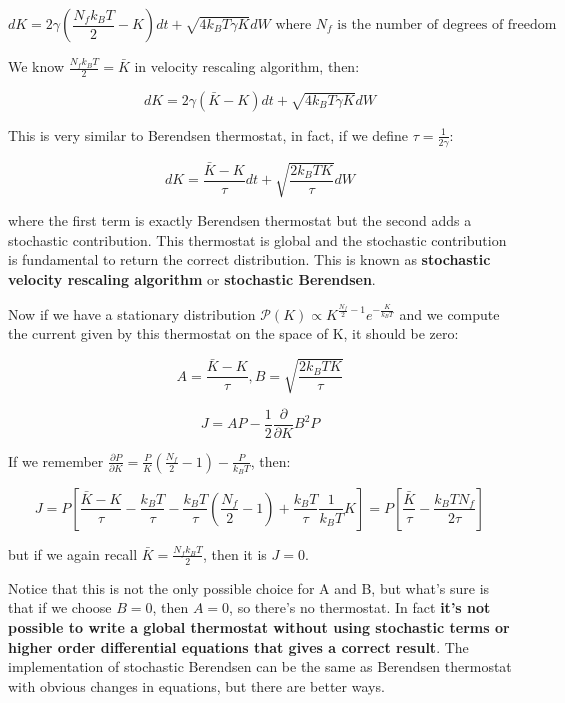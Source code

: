 \documentclass[a4paper, italian, openany]{book}
\begin{document}
$$dK= 2\gamma \left ( \frac{N_f k_B T}{2} - K \right )dt + \sqrt{4k_B T \gamma K}dW \mbox{ where } N_f \mbox{ is the number of degrees of freedom}$$

We know $\frac{N_f k_B T}{2} = \bar{K}$ in velocity rescaling algorithm, then:

$$dK = 2\gamma (\bar{K} -K)dt + \sqrt{4 k_B T \gamma K}dW$$

This is very similar to Berendsen thermostat, in fact, if we define $\tau = \frac{1}{2\gamma}$:

$$dK = \frac{\bar{K} - K}{\tau}dt + \sqrt{\frac{2 k_B T K}{\tau}}dW$$

where the first term is exactly Berendsen thermostat but the second adds a stochastic contribution. This thermostat is global and the stochastic contribution is fundamental to return the correct distribution. This is known as \textbf{stochastic velocity rescaling algorithm} or \textbf{stochastic Berendsen}.

\medskip

Now if we have a stationary distribution $\mathcal{P}(K) \propto K^{\frac{N_f}{2}-1}e^{-\frac{K}{k_B T}}$ and we compute the current given by this thermostat on the space of K, it should be zero:

$$A = \frac{\bar{K} -K}{\tau}, B = \sqrt{\frac{2k_B T K}{\tau}}$$

$$J = AP - \frac{1}{2}\frac{\partial}{\partial K}B^2 P$$

If we remember $\frac{\partial P}{\partial K} = \frac{P}{K} \left ( \frac{N_f}{2} -1 \right ) - \frac{P}{k_B T}$, then:

$$J = P \left [ \frac{\bar{K} -K}{\tau} - \frac{k_B T }{\tau} - \frac{k_B T}{\tau}\left ( \frac{N_f}{2} -1 \right ) + \frac{k_B T}{\tau}\frac{1}{k_B T}K\right ] = P\left [ \frac{\bar{K}}{\tau} - \frac{k_B T N_f}{2\tau} \right ]$$

but if we again recall $\bar{K} = \frac{N_f k_B T}{2}$, then it is $J=0$.

\medskip

Notice that this is not the only possible choice for A and B, but what's sure is that if we choose $B=0$, then $A=0$, so there's no thermostat. In fact \textbf{it's not possible to write a global thermostat without using stochastic terms or higher order differential equations that gives a correct result}.\newline
The implementation of stochastic Berendsen can be the same as Berendsen thermostat with obvious changes in equations, but there are better ways.
\end{document}
